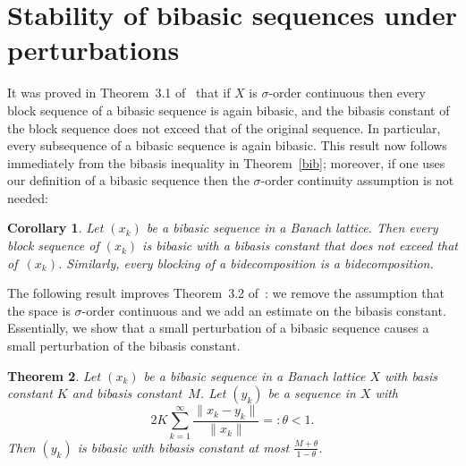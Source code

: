 \documentclass[12pt]{amsart}
\theoremstyle{plain}
\newtheorem{theorem}{Theorem}[section]
\newtheorem{corollary}[theorem]{Corollary}
\theoremstyle{definition}
\newtheorem{question}[theorem]{Question}
\newcommand{\norm}[1]{\lVert#1\rVert}
\begin{document}


\section{Stability of bibasic sequences under perturbations}

It was proved in Theorem~3.1 of~\cite{Gumenchuk:15} that if $X$ is
$\sigma$-order continuous then every block sequence of a bibasic
sequence is again bibasic, and the bibasis constant of the block
sequence does not exceed that of the original sequence. In particular,
every subsequence of a bibasic sequence is again bibasic. This result
now follows immediately from the bibasis inequality in
Theorem~\ref{bib}; moreover, if one uses our definition of a bibasic
sequence then the $\sigma$-order continuity assumption
is not needed:


\begin{corollary}\label{blocks}
  Let $(x_k)$ be a bibasic sequence in a Banach lattice. Then every
  block sequence of $(x_k)$ is bibasic with a bibasis constant that
  does not exceed that of~$(x_k)$. Similarly, every blocking of a
  bidecomposition is a bidecomposition.
\end{corollary}

The following result improves Theorem~3.2 of~\cite{Gumenchuk:15}: we
remove the assumption that the space is $\sigma$-order continuous and
we add an estimate on the bibasis constant. Essentially, we show that
a small perturbation of a bibasic sequence causes a small perturbation of the
bibasis constant.

\begin{theorem}\label{biPSP}
  Let $(x_k)$ be a bibasic sequence in a Banach lattice $X$ with basis
  constant $K$ and bibasis constant~$M$. Let $(y_k)$ be a sequence in
  $X$ with
  \begin{displaymath}
    2K\sum_{k=1}^\infty\frac{\norm{x_k-y_k}}{\norm{x_k}}=:\theta<1.
  \end{displaymath}
  Then $(y_k)$ is bibasic with bibasis constant at most
  \begin{math}
    \frac{M+\theta}{1-\theta}.
  \end{math}
\end{theorem}
\end{document}
